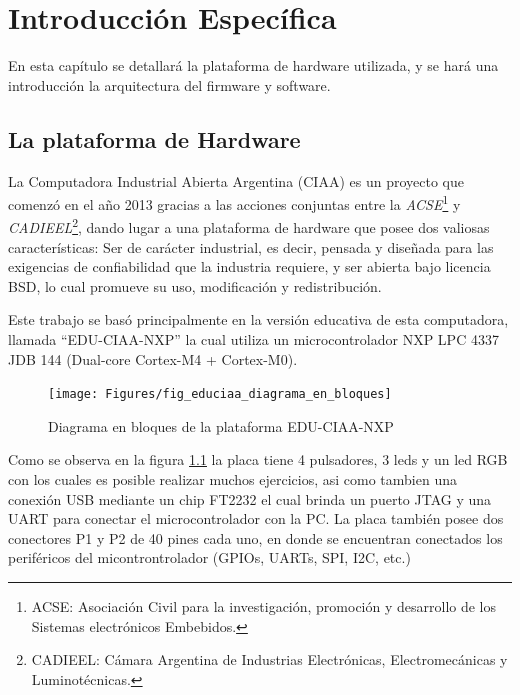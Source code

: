 \chapter{Introducción Específica} %

\label{Chapter2}

En esta capítulo se detallará la plataforma de hardware utilizada, y se hará una introducción la arquitectura del firmware y software.
\section{La plataforma de Hardware}
\label{sec:plataforma}

La Computadora Industrial Abierta Argentina (CIAA) es un proyecto que comenzó en el año 2013 
gracias a las acciones conjuntas entre la \textit{ACSE}\footnote{ACSE: Asociación Civil para la investigación, promoción y desarrollo de los Sistemas electrónicos Embebidos.} y \textit{CADIEEL}\footnote{CADIEEL: Cámara Argentina de Industrias Electrónicas, Electromecánicas y Luminotécnicas.}, dando lugar a una plataforma de hardware que posee dos valiosas características: Ser de carácter industrial, es decir, pensada y diseñada para las exigencias de confiabilidad que la industria requiere, y ser abierta bajo licencia BSD, lo cual promueve su uso, modificación y redistribución.

Este trabajo se basó principalmente en la versión educativa de esta computadora, llamada “EDU-CIAA-NXP” la cual utiliza un microcontrolador NXP LPC 4337 JDB 144 (Dual-core Cortex-M4 + Cortex-M0).

\begin{figure}[ht]
  \centering
    \texttt{[image: Figures/fig\_educiaa\_diagrama\_en\_bloques]}
  \caption{Diagrama en bloques de la plataforma EDU-CIAA-NXP}
  \label{fig:educiaaBloques}
\end{figure}

Como se observa en la figura \ref{fig:educiaaBloques} la placa tiene 4 pulsadores, 3 leds y un led RGB con los cuales es posible realizar muchos ejercicios, asi como tambien una conexión USB mediante un chip FT2232 el cual brinda un puerto JTAG y una UART para conectar el microcontrolador con la PC.
La placa también posee dos conectores P1 y P2 de 40 pines cada uno, en donde se encuentran conectados los periféricos del micontrontrolador (GPIOs, UARTs, SPI, I2C, etc.)


